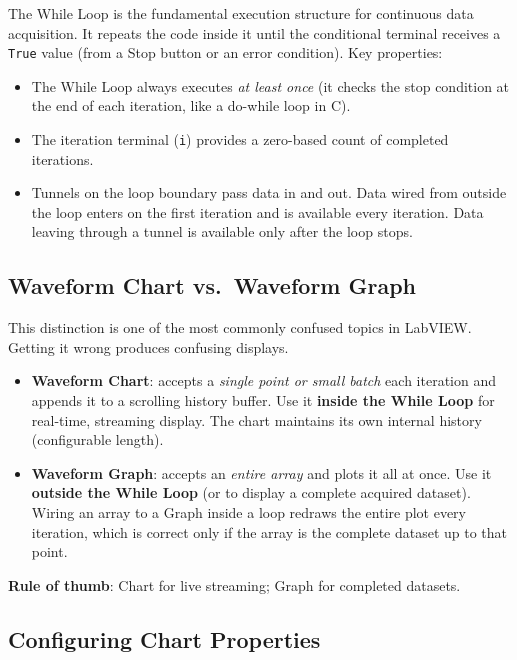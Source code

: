 The While Loop is the fundamental execution structure for continuous data acquisition. It repeats the code inside it until the conditional terminal receives a \texttt{True} value (from a Stop button or an error condition). Key properties:

\begin{itemize}[leftmargin=1.5em]
\item The While Loop always executes \emph{at least once} (it checks the stop condition at the end of each iteration, like a do-while loop in C).
\item The iteration terminal (\texttt{i}) provides a zero-based count of completed iterations.
\item Tunnels on the loop boundary pass data in and out. Data wired from outside the loop enters on the first iteration and is available every iteration. Data leaving through a tunnel is available only after the loop stops.
\end{itemize}

\subsection{Waveform Chart vs.\ Waveform Graph}

This distinction is one of the most commonly confused topics in LabVIEW. Getting it wrong produces confusing displays.

\begin{keyconceptbox}
\begin{itemize}[nosep,leftmargin=1.5em]
\item \textbf{Waveform Chart}: accepts a \emph{single point or small batch} each iteration and appends it to a scrolling history buffer. Use it \textbf{inside the While Loop} for real-time, streaming display. The chart maintains its own internal history (configurable length).
\item \textbf{Waveform Graph}: accepts an \emph{entire array} and plots it all at once. Use it \textbf{outside the While Loop} (or to display a complete acquired dataset). Wiring an array to a Graph inside a loop redraws the entire plot every iteration, which is correct only if the array is the complete dataset up to that point.
\end{itemize}
\textbf{Rule of thumb}: Chart for live streaming; Graph for completed datasets.
\end{keyconceptbox}

\subsection{Configuring Chart Properties}

